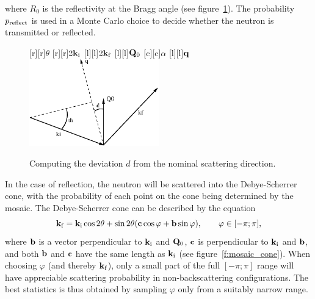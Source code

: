 where $R_0$ is the reflectivity at the Bragg angle (see
figure~\ref{f:mosaic_angle}). The probability $p_{\rm reflect}$ is used
in a Monte Carlo choice to decide whether the neutron is transmitted or
reflected.
%
\begin{figure}
  \begin{center}
    [r][r]{$\theta$}
    [r][r]{$2{\bf k}_{\rm i}$}
    [l][l]{$2{\bf k}_{\rm f}$}
    [l][l]{${\bf Q}_0$}
    [c][c]{$\alpha$}
    [l][l]{$\bf q$}
    \includegraphics[width=0.5\textwidth]{figures/mosaic_angle.eps}
  \end{center}
\caption{Computing the deviation $d$ from the nominal scattering direction.}
\label{f:mosaic_angle}
\end{figure}

In the case of reflection, the neutron will be scattered into the
Debye-Scherrer cone, with the probability of each point on the cone
being determined by the mosaic. The Debye-Scherrer cone can be described
by the equation
\begin{equation}
  \label{eq:mosaic_cone}
  {\bf k}_{\rm f} = {\bf k}_{\rm i}\cos2\theta +
      \sin2\theta({\bf c}\cos\varphi + {\bf b}\sin\varphi),
      \qquad\varphi\in[-\pi;\pi],
\end{equation}
where ${\bf b}$ is a vector perpendicular to ${\bf k}_{\rm i}$ and ${\bf
Q}_0$, ${\bf c}$ is perpendicular to ${\bf k}_{\rm i}$ and ${\bf b}$,
and both ${\bf b}$ and ${\bf c}$ have the same length as ${\bf k}_{\rm
  i}$ (see figure~\ref{f:mosaic_cone}). When choosing $\varphi$ (and
thereby ${\bf k}_{\rm f}$), only a small part of the full $[-\pi; \pi]$
range will have appreciable scattering probability in non-backscattering
configurations. The best statistics is thus obtained by sampling
$\varphi$ only from a suitably narrow range.

